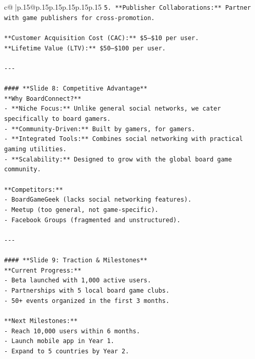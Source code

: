 \documentclass{article}
\begin{document}
{\begin{supertabular}{c@{$\;$}|p{.15\linewidth}@{}p{.15\linewidth}p{.15\linewidth}p{.15\linewidth}p{.15\linewidth}p{.15\linewidth}}
{{{\texttt{5. **Publisher Collaborations:** Partner with game publishers for cross{-}promotion.  } \\
\\ 
\texttt{**Customer Acquisition Cost (CAC):** \$5–\$10 per user.  } \\
\texttt{**Lifetime Value (LTV):** \$50–\$100 per user.  } \\
\\ 
\texttt{{-}{-}{-}} \\
\\ 
\texttt{\#\#\#\# **Slide 8: Competitive Advantage**} \\
\texttt{**Why BoardConnect?**  } \\
\texttt{{-} **Niche Focus:** Unlike general social networks, we cater specifically to board gamers.  } \\
\texttt{{-} **Community{-}Driven:** Built by gamers, for gamers.  } \\
\texttt{{-} **Integrated Tools:** Combines social networking with practical gaming utilities.  } \\
\texttt{{-} **Scalability:** Designed to grow with the global board game community.  } \\
\\ 
\texttt{**Competitors:**  } \\
\texttt{{-} BoardGameGeek (lacks social networking features).  } \\
\texttt{{-} Meetup (too general, not game{-}specific).  } \\
\texttt{{-} Facebook Groups (fragmented and unstructured).  } \\
\\ 
\texttt{{-}{-}{-}} \\
\\ 
\texttt{\#\#\#\# **Slide 9: Traction \& Milestones**} \\
\texttt{**Current Progress:**  } \\
\texttt{{-} Beta launched with 1,000 active users.  } \\
\texttt{{-} Partnerships with 5 local board game clubs.  } \\
\texttt{{-} 50+ events organized in the first 3 months.  } \\
\\ 
\texttt{**Next Milestones:**  } \\
\texttt{{-} Reach 10,000 users within 6 months.  } \\
\texttt{{-} Launch mobile app in Year 1.  } \\
\texttt{{-} Expand to 5 countries by Year 2.  } \\
}}}
\end{supertabular}}
\end{document}
